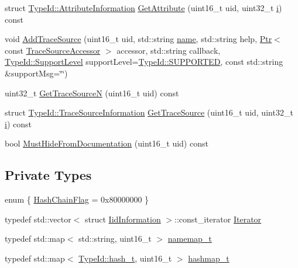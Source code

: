 \begin{DoxyCompactItemize}
\item 
struct \hyperlink{structns3_1_1TypeId_1_1AttributeInformation}{Type\+Id\+::\+Attribute\+Information} \hyperlink{classns3_1_1IidManager_ae511907e47b48166763e60c583a5a940}{Get\+Attribute} (uint16\+\_\+t uid, uint32\+\_\+t \hyperlink{lte__uplink__power__control_8m_a6f6ccfcf58b31cb6412107d9d5281426}{i}) const 
\item 
void \hyperlink{classns3_1_1IidManager_af259066883724bcdd6f62a15596c1053}{Add\+Trace\+Source} (uint16\+\_\+t uid, std\+::string \hyperlink{generate__test__data__lte__spectrum__model_8m_ab74e6bf80237ddc4109968cedc58c151}{name}, std\+::string help, \hyperlink{classns3_1_1Ptr}{Ptr}$<$ const \hyperlink{classns3_1_1TraceSourceAccessor}{Trace\+Source\+Accessor} $>$ accessor, std\+::string callback, \hyperlink{classns3_1_1TypeId_ad55d31e57490a83a3ededa096a8d2588}{Type\+Id\+::\+Support\+Level} support\+Level=\hyperlink{classns3_1_1TypeId_ad55d31e57490a83a3ededa096a8d2588a3eb3cddc13c7c70f1ab58e15babdda11}{Type\+Id\+::\+S\+U\+P\+P\+O\+R\+T\+ED}, const std\+::string \&support\+Msg=\char`\"{}\char`\"{})
\item 
uint32\+\_\+t \hyperlink{classns3_1_1IidManager_a224c757046ca8dffb17d028f474db167}{Get\+Trace\+SourceN} (uint16\+\_\+t uid) const 
\item 
struct \hyperlink{structns3_1_1TypeId_1_1TraceSourceInformation}{Type\+Id\+::\+Trace\+Source\+Information} \hyperlink{classns3_1_1IidManager_a4fc3f4e3944d2faa9121275b993890d9}{Get\+Trace\+Source} (uint16\+\_\+t uid, uint32\+\_\+t \hyperlink{lte__uplink__power__control_8m_a6f6ccfcf58b31cb6412107d9d5281426}{i}) const 
\item 
bool \hyperlink{classns3_1_1IidManager_af49b126e8bc80cf7dbdb36ed3d092019}{Must\+Hide\+From\+Documentation} (uint16\+\_\+t uid) const 
\end{DoxyCompactItemize}
\subsection*{Private Types}
\begin{DoxyCompactItemize}
\item 
enum \{ \hyperlink{classns3_1_1IidManager_a111b3e20b0fa2fb672257fa63aca771eada8547fce936ccfe8094f1f1f367e53f}{Hash\+Chain\+Flag} = 0x80000000
 \}
\item 
typedef std\+::vector$<$ struct \hyperlink{structns3_1_1IidManager_1_1IidInformation}{Iid\+Information} $>$\+::const\+\_\+iterator \hyperlink{classns3_1_1IidManager_adb03042a94452c8e02a5aab760804d1e}{Iterator}
\item 
typedef std\+::map$<$ std\+::string, uint16\+\_\+t $>$ \hyperlink{classns3_1_1IidManager_a2b13b1c19ecc94df463fc2edf522655e}{namemap\+\_\+t}
\item 
typedef std\+::map$<$ \hyperlink{classns3_1_1TypeId_ab3fc1475c4a0c2cfb35b976dbd609057}{Type\+Id\+::hash\+\_\+t}, uint16\+\_\+t $>$ \hyperlink{classns3_1_1IidManager_a18fb4e9506aba477e14ad7dd367dbb29}{hashmap\+\_\+t}
\end{DoxyCompactItemize}

